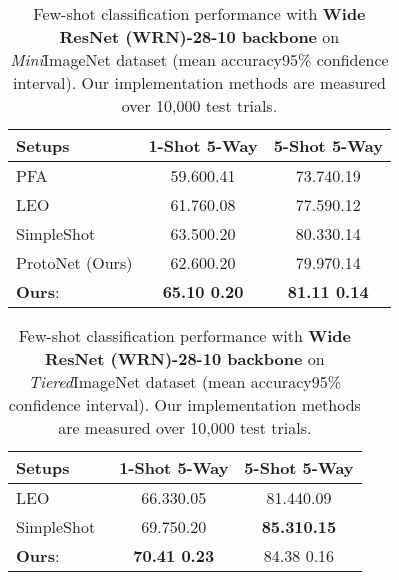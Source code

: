 \begin{table}[tbp]    
	\centering
	\tabcolsep 10pt
	\caption{Few-shot classification performance with \textbf{Wide ResNet (WRN)-28-10 backbone} on {\it Mini}ImageNet dataset (mean accuracy95\% confidence interval). Our implementation methods are measured over 10,000 test trials.}
	{\small
		\begin{tabular}{@{\;}lcc@{\;}}
			\addlinespace
			\toprule
			Setups  & {\bf 1-Shot 5-Way} & {\bf 5-Shot 5-Way} \\    \midrule
			PFA~\cite{Qiao2017Few} & 59.60{\tiny  0.41} & 73.74{\tiny  0.19} \\
			LEO~\cite{Rusu2018Meta} & 61.76{\tiny  0.08} & 77.59{\tiny  0.12} \\
			SimpleShot~\cite{Wang2019Simple}& 63.50{\tiny  0.20} & 80.33{\tiny  0.14}\\
			ProtoNet (Ours)  & 62.60{\tiny  0.20} & 79.97{\tiny  0.14} \\
			\midrule
			{\bf Ours}: {\feat}      &  \bf 65.10 {\tiny  0.20} & \bf 81.11 {\tiny  0.14} \\
			\bottomrule
	\end{tabular}}
	\label{supp-tab:wrn}
\end{table}

\begin{table}[tbp]    
	\centering
	\tabcolsep 10pt
	\caption{Few-shot classification performance with \textbf{Wide ResNet (WRN)-28-10 backbone} on {\it Tiered}ImageNet dataset (mean accuracy95\% confidence interval). Our implementation methods are measured over 10,000 test trials.}
	{\small
		\begin{tabular}{@{\;}lcc@{\;}}
			\addlinespace
			\toprule
			Setups  & {\bf 1-Shot 5-Way} & {\bf 5-Shot 5-Way} \\    \midrule
			LEO~\cite{Rusu2018Meta}  & 66.33{\tiny  0.05} & 81.44{\tiny  0.09} \\
			SimpleShot~\cite{Wang2019Simple}  & 69.75{\tiny  0.20} & \bf 85.31{\tiny  0.15} \\
			\midrule
			{\bf Ours}: {\feat}      &  \bf 70.41 {\tiny  0.23} &  84.38 {\tiny  0.16} \\
			\bottomrule
	\end{tabular}}
	\label{supp-tab:wrn_tiered}
\end{table}

